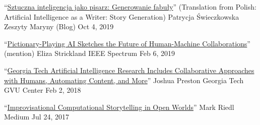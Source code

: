   \cvmedia
    {``\href{https://zeszytymaryny.pl/naukowo/sztuczna-inteligencja-jako-pisarz-generowanie-fabuly/}{Sztuczna inteligencja jako pisarz: Generowanie fabuły}'' \newline (Translation from Polish: Artificial Intelligence as a Writer: Story Generation)} %
    {Patrycja Świeczkowska} %
    {Zeszyty Maryny (Blog)} %
    {Oct 4, 2019} %


  \cvmedia
    {``\href{https://spectrum.ieee.org/tech-talk/robotics/artificial-intelligence/pictionary-playing-ai-sketches-the-future-of-human-machine-collaborations}{Pictionary-Playing AI Sketches the Future of Human-Machine Collaborations}'' (mention)} %
    {Eliza Strickland} %
    {IEEE Spectrum} %
    {Feb 6, 2019} %


  \cvmedia
    {``\href{https://gvu.gatech.edu/georgia-tech-aaai2018}{Georgia Tech Artificial Intelligence Research Includes Collaborative Approaches with Humans, Automating Content, and More}''} %
    {Joshua Preston} %
    {Georgia Tech GVU Center} %
    {Feb 2, 2018} %


  \cvmedia
    {``\href{https://medium.com/@mark_riedl/improvisational-storytelling-in-open-world-2359d7f649cf}{Improvisational Computational Storytelling in Open Worlds}''} %
    {Mark Riedl} %
    {Medium} %
    {Jul 24, 2017} %


